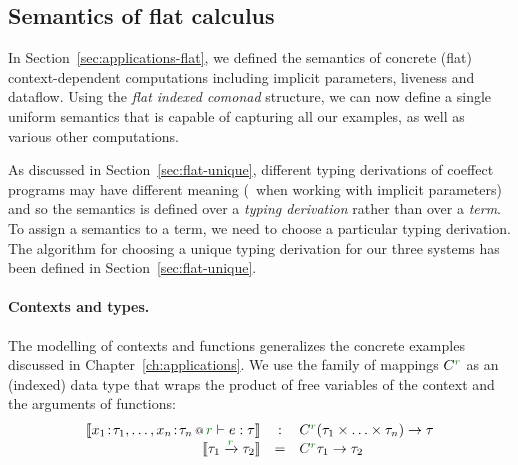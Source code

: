 \begin{figure*}[t]
\label{fig:semantics-flat}
\end{figure*}


\subsection{Semantics of flat calculus}
\label{sec:semantics-flat-calculus}

In Section~\ref{sec:applications-flat}, we defined the semantics of concrete (flat) context-dependent
computations including implicit parameters, liveness and dataflow. Using the \emph{flat indexed
comonad} structure, we can now define a single uniform semantics that is capable of capturing all
our examples, as well as various other computations.

As discussed in Section~\ref{sec:flat-unique}, different typing derivations of coeffect programs
may have different meaning (\eg~when working with implicit parameters) and so the semantics is
defined over a \emph{typing derivation} rather than over a \emph{term}. To assign a semantics to
a term, we need to choose a particular typing derivation. The algorithm for choosing a unique
typing derivation for our three systems has been defined in Section~\ref{sec:flat-unique}.

\paragraph{Contexts and types.}
The modelling of contexts and functions generalizes the concrete examples discussed in
Chapter~\ref{ch:applications}. We use the family of mappings $\ctyp{\cclrd{r}}{}$ as an (indexed)
data type that wraps the product of free variables of the context and the arguments of functions:
%
\begin{equation*}
\begin{array}{rcl}
\sem{\coctx{x_1\!:\!\tau_1, \ldots, x_n\!:\!\tau_n}{ \cclrd{r} } \vdash e : \tau}
  &:& \ctyp{\cclrd{r}}{(\tau_1 \times \ldots \times \tau_n)} \rightarrow \tau\\
\sem{\tau_1 \xrightarrow{\cclrd{r}} \tau_2} &=& \ctyp{\cclrd{r}}{\tau_1} \rightarrow \tau_2
\end{array}
\end{equation*}

